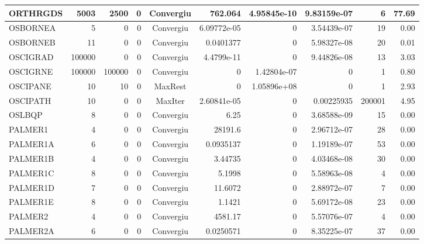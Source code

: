 \begin{center}
\begin{longtable}{|l|r|r|r|c|r|r|r|r|r|}
ORTHRGDS &   5003 &   2500 &      0 & Convergiu  &     762.064 &    4.95845e-10 & 9.83159e-07 &      6 &   77.69 \\ \hline
OSBORNEA &      5 &      0 &      0 & Convergiu  & 6.09772e-05 &              0 & 3.54439e-07 &     19 &    0.00 \\ \hline
OSBORNEB &     11 &      0 &      0 & Convergiu  &   0.0401377 &              0 & 5.98327e-08 &     20 &    0.01 \\ \hline
OSCIGRAD & 100000 &      0 &      0 & Convergiu  &  4.4799e-11 &              0 & 9.44826e-08 &     13 &    3.03 \\ \hline
OSCIGRNE & 100000 & 100000 &      0 & Convergiu  &           0 &    1.42804e-07 &           0 &      1 &    0.80 \\ \hline
OSCIPANE &     10 &     10 &      0 & MaxRest    &           0 &    1.05896e+08 &           0 &      1 &    2.93 \\ \hline
OSCIPATH &     10 &      0 &      0 & MaxIter    & 2.60841e-05 &              0 &  0.00225935 & 200001 &    4.95 \\ \hline
  OSLBQP &      8 &      0 &      0 & Convergiu  &        6.25 &              0 & 3.68588e-09 &     15 &    0.00 \\ \hline
 PALMER1 &      4 &      0 &      0 & Convergiu  &     28191.6 &              0 & 2.96712e-07 &     28 &    0.00 \\ \hline
PALMER1A &      6 &      0 &      0 & Convergiu  &   0.0935137 &              0 & 1.19189e-07 &     53 &    0.00 \\ \hline
PALMER1B &      4 &      0 &      0 & Convergiu  &     3.44735 &              0 & 4.03468e-08 &     30 &    0.00 \\ \hline
PALMER1C &      8 &      0 &      0 & Convergiu  &      5.1998 &              0 & 5.58963e-08 &      4 &    0.00 \\ \hline
PALMER1D &      7 &      0 &      0 & Convergiu  &     11.6072 &              0 & 2.88972e-07 &      7 &    0.00 \\ \hline
PALMER1E &      8 &      0 &      0 & Convergiu  &      1.1421 &              0 & 5.69172e-08 &     23 &    0.00 \\ \hline
 PALMER2 &      4 &      0 &      0 & Convergiu  &     4581.17 &              0 & 5.57076e-07 &      4 &    0.00 \\ \hline
PALMER2A &      6 &      0 &      0 & Convergiu  &   0.0250571 &              0 & 8.35225e-07 &     37 &    0.00 \\ \hline

\end{longtable}
\end{center}

